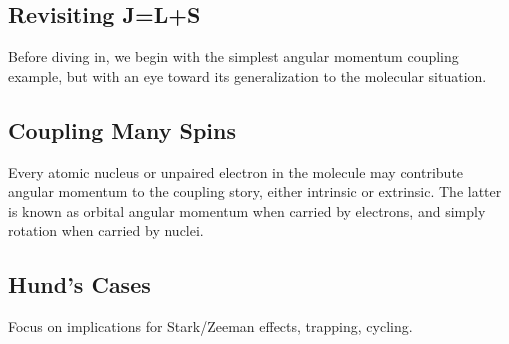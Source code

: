 
\subsection{Revisiting J=L+S}

Before diving in, we begin with the simplest angular momentum coupling example, but with an eye toward its generalization to the molecular situation.

\subsection{Coupling Many Spins}

Every atomic nucleus or unpaired electron in the molecule may contribute angular momentum to the coupling story, either intrinsic or extrinsic.
The latter is known as orbital angular momentum when carried by electrons, and simply rotation when carried by nuclei.

\subsection{Hund's Cases}

Focus on implications for Stark/Zeeman effects, trapping, cycling.




\ifx\justbeingincluded\undefined

\fi
